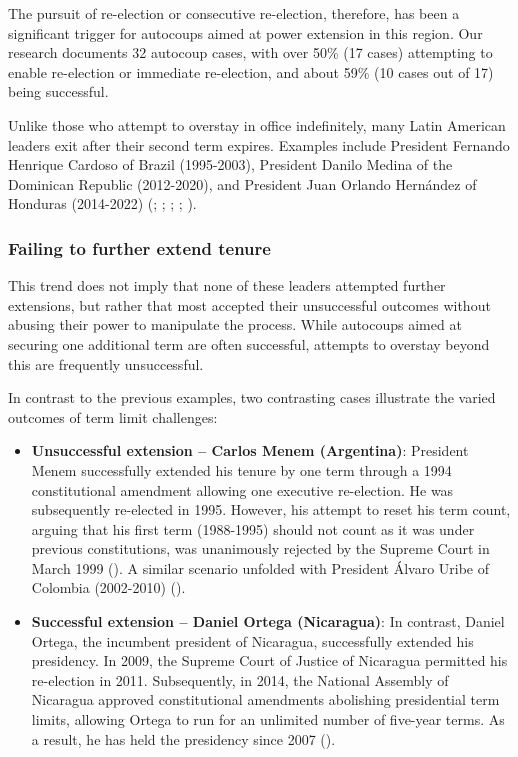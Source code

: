 \documentclass[
  12pt,
]{report}
\begin{document}
The pursuit of re-election or consecutive re-election, therefore, has
been a significant trigger for autocoups aimed at power extension in
this region. Our research documents 32 autocoup cases, with over 50\%
(17 cases) attempting to enable re-election or immediate re-election,
and about 59\% (10 cases out of 17) being successful.

Unlike those who attempt to overstay in office indefinitely, many Latin
American leaders exit after their second term expires. Examples include
President Fernando Henrique Cardoso of Brazil (1995-2003), President
Danilo Medina of the Dominican Republic (2012-2020), and President Juan
Orlando Hernández of Honduras (2014-2022)
(;
;
;
; ).

\subsubsection*{Failing to further extend
tenure}\label{failing-to-further-extend-tenure}

This trend does not imply that none of these leaders attempted further
extensions, but rather that most accepted their unsuccessful outcomes
without abusing their power to manipulate the process. While autocoups
aimed at securing one additional term are often successful, attempts to
overstay beyond this are frequently unsuccessful.

In contrast to the previous examples, two contrasting cases illustrate
the varied outcomes of term limit challenges:

\begin{itemize}
\item
  \textbf{Unsuccessful extension -- Carlos Menem (Argentina)}: President
  Menem successfully extended his tenure by one term through a 1994
  constitutional amendment allowing one executive re-election. He was
  subsequently re-elected in 1995. However, his attempt to reset his
  term count, arguing that his first term (1988-1995) should not count
  as it was under previous constitutions, was unanimously rejected by
  the Supreme Court in March 1999 (). A similar scenario unfolded with President Álvaro Uribe of
  Colombia (2002-2010) ().
\item
  \textbf{Successful extension -- Daniel Ortega (Nicaragua)}: In
  contrast, Daniel Ortega, the incumbent president of Nicaragua,
  successfully extended his presidency. In 2009, the Supreme Court of
  Justice of Nicaragua permitted his re-election in 2011. Subsequently,
  in 2014, the National Assembly of Nicaragua approved constitutional
  amendments abolishing presidential term limits, allowing Ortega to run
  for an unlimited number of five-year terms. As a result, he has held
  the presidency since 2007 ().
\end{itemize}
\end{document}
